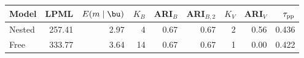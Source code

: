 \begin{tabular}{lrrrrrrrr}
\hline\hline
Model & LPML & $E(m\mid\bu)$ & $K_B$ & ARI$_B$ & ARI$_{B,2}$ & $K_V$ & ARI$_V$ & $\tau_{\rm pp}$ \\
\hline
Nested & 257.41 & 2.97 & 4 & 0.67 & 0.67 & 2 & 0.56 & 0.436 \\
Free & 333.77 & 3.64 & 14 & 0.67 & 0.67 & 1 & 0.00 & 0.422 \\
\hline\hline
\end{tabular}
